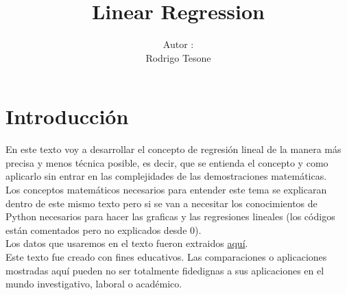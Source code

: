 \documentclass{article}
\title{Linear Regression}
\author{Autor :\\Rodrigo Tesone}
\date{}
\begin{document}
\maketitle

\section{Introducción}
En este texto voy a desarrollar el concepto de regresión lineal de la manera más precisa y menos técnica posible, es decir, que se entienda el concepto y como aplicarlo sin entrar en las complejidades de las demostraciones matemáticas.\\
Los conceptos matemáticos necesarios para entender este tema se explicaran dentro de este mismo texto pero si se van a necesitar los conocimientos de Python necesarios para hacer las graficas y las regresiones lineales (los códigos están comentados pero no explicados desde 0).\\
Los datos que usaremos en el texto fueron extraidos \href{https://www.kaggle.com/c/house-prices-advanced-regression-techniques/data?select=test.csv}{aquí}.\\
Este texto fue creado con fines educativos. Las comparaciones o aplicaciones mostradas aquí pueden no ser totalmente fidedignas a sus aplicaciones en el mundo investigativo, laboral o académico.
\end{document}

